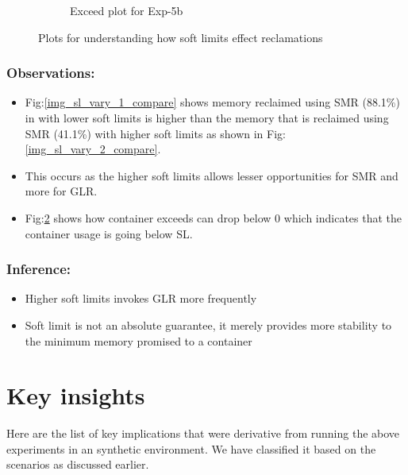 \begin{figure}[t!]
\begin{subfigure}[t]{0.48\textwidth}
	    \caption{Exceed plot for Exp-5b}
	    \label{img_sl_vary_2_exceed}
	  \end{subfigure}
	  \caption{Plots for understanding how soft limits effect reclamations}
	\end{figure}
	  
	\subsubsection{Observations:}
	
	  \begin{itemize}
	  \item Fig:\ref{img_sl_vary_1_compare} shows memory reclaimed using SMR (88.1\%) in with lower soft limits is higher than the 
memory that is reclaimed using SMR (41.1\%) with higher soft limits as shown in Fig:\ref{img_sl_vary_2_compare}. 
	  \item This occurs as the higher soft limits allows lesser opportunities for SMR and more for GLR.
	  \item Fig:\ref{img_sl_vary_2_exceed} shows how container exceeds can drop below 0 which indicates that the container usage is 
going below SL.
	\end{itemize}

	\subsubsection{Inference:}
	
	\begin{itemize}
	  \item Higher soft limits invokes GLR more frequently
	  \item Soft limit is not an absolute guarantee, it merely provides more stability to the minimum memory promised to a container 
	\end{itemize}
	
  
  \section{Key insights}
    
    Here are the list of key implications that were derivative from running the above experiments in an synthetic environment. We have 
classified it based on the scenarios as discussed earlier.
    

